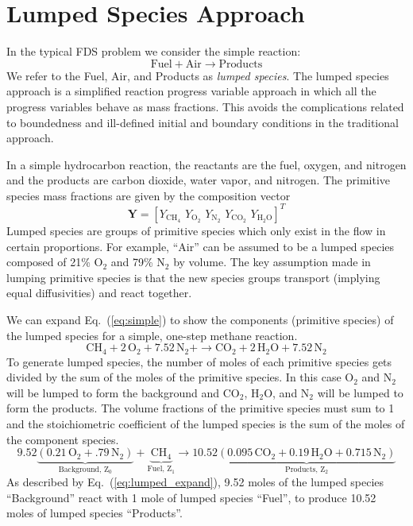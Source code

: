 \section{Lumped Species Approach}
In the typical FDS problem we consider the simple reaction:
\begin{equation}\label{eq:simple}
\mathrm{Fuel + Air \rightarrow Products}
\end{equation}
We refer to the Fuel, Air, and Products as \emph{lumped species}.  The lumped species approach is a simplified reaction progress variable approach \cite{fox2003} in which all the progress variables behave as mass fractions. This avoids the complications related to boundedness and ill-defined initial and boundary conditions in the traditional approach.

In a simple hydrocarbon reaction, the reactants are the fuel, oxygen, and nitrogen and the products are carbon dioxide, water vapor, and nitrogen. The primitive species mass fractions are given by the composition vector
\begin{equation}\label{eq:prim_vector}
\mathbf{Y} = [Y_{\mathrm{CH}_4}\, \, Y_{\mathrm{O}_2}\, \, Y_{\mathrm{N}_2}\, \, Y_{\mathrm{CO}_2}\, \, Y_{\mathrm{H}_2\mathrm{O}}]^T
\end{equation}
Lumped species are groups of primitive species which only exist in the flow in certain proportions. For example, ``Air'' can be assumed to be a lumped species composed of 21\% O$_2$ and 79\% N$_2$ by volume. The key assumption made in lumping primitive species is that the new species groups transport (implying equal diffusivities) and react together. 

We can expand Eq.~(\ref{eq:simple}) to show the components (primitive species) of the lumped species for a simple, one-step methane reaction.
\begin{equation}\label{eq:lumped_methane}
\mbox{CH}_4 + 2\, \mbox{O}_2+7.52\,\mbox{N}_2+\rightarrow \mbox{CO}_2+2\,\mbox{H}_2\mbox{O}+7.52\,\mbox{N}_2
\end{equation}
To generate lumped species, the number of moles of each primitive species gets divided by the sum of the moles of the primitive species. In this case O$_{2}$ and N$_{2}$ will be lumped to form the background and CO$_{2}$, H$_{2}$O, and N$_{2}$ will be lumped to form the products. The volume fractions of the primitive species must sum to 1 and the stoichiometric coefficient of the lumped species is the sum of the moles of the component species.
\begin{equation}\label{eq:lumped_expand}
\mathrm{9.52\underbrace{(0.21\,\mbox{O}_2+.79\,\mbox{N}_2)}_\text{Background,~$Z_0$}+\underbrace{\mbox{CH}_4}_\text{Fuel,~$Z_1$} \rightarrow 10.52\underbrace{(0.095\,\mbox{CO}_2+0.19\,\mbox{H}_2\mbox{O}+0.715\,\mbox{N}_2)}_\text{Products,~$Z_2$}}
\end{equation}
As described by Eq.~(\ref{eq:lumped_expand}), 9.52 moles of the lumped species ``Background'' react with 1 mole of lumped species ``Fuel'', to produce 10.52 moles of lumped species ``Products''. 

